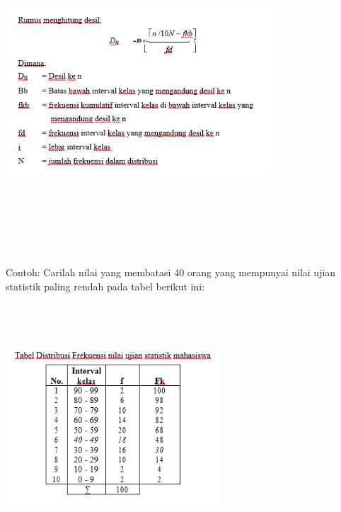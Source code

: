 \documentclass[11pt,fleqn]{book} %
\begin{document}
{\includegraphics[width = 10cm, height= 12cm]{Pictures/rizkie4.png}

Contoh:
Carilah nilai yang membatasi 40 orang yang mempunyai nilai ujian statistik paling rendah pada tabel berikut ini:
\includegraphics[width = 8cm, height= 10cm]{Pictures/rizkie5.png}

}
\end{document}
